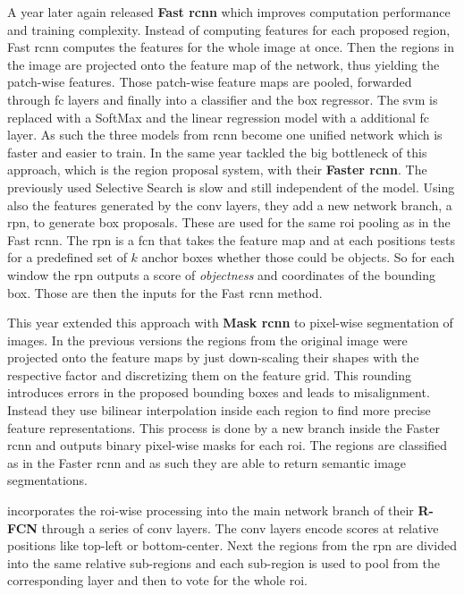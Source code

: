 A year later again \citet{girshick_fast_2015} released \textbf{Fast \gls{rcnn}} which improves computation performance and training complexity. Instead of computing features for each proposed region, Fast \gls{rcnn} computes the features for the whole image at once. Then the regions in the image are projected onto the feature map of the network, thus yielding the patch-wise features. Those patch-wise feature maps are pooled, forwarded through \gls{fc} layers and finally into a classifier and the box regressor. The \gls{svm} is replaced with a SoftMax and the linear regression model with a additional \gls{fc} layer. As such the three models from \gls{rcnn} become one unified network which is faster and easier to train.
\clearpage
In the same year \citet{ren_faster_2015} tackled the big bottleneck of this approach, which is the region proposal system, with their \textbf{Faster \gls{rcnn}}. The previously used Selective Search is slow and still independent of the model. Using also the features generated by the \gls{conv} layers, they add a new network branch, a \gls{rpn}, to generate box proposals. These are used for the same \gls{roi} pooling as in the Fast \gls{rcnn}. The \gls{rpn} is a \gls{fcn} that takes the feature map and at each positions tests for a predefined set of $k$ anchor boxes whether those could be objects. So for each window the \gls{rpn} outputs a score of \textit{objectness} and coordinates of the bounding box. Those are then the inputs for the Fast \gls{rcnn} method.

This year \citet{he_mask_2017} extended this approach with \textbf{Mask \gls{rcnn}} to pixel-wise segmentation of images. In the previous versions the regions from the original image were projected onto the feature maps by just down-scaling their shapes with the respective factor and discretizing them on the feature grid. This rounding introduces errors in the proposed bounding boxes and leads to misalignment. Instead they use bilinear interpolation inside each region to find more precise feature representations. This process is done by a new branch inside the Faster \gls{rcnn} and outputs binary pixel-wise masks for each \gls{roi}. The regions are classified as in the Faster \gls{rcnn} and as such they are able to return semantic image segmentations.

\citet{dai_r-fcn:_2016} incorporates the \gls{roi}-wise processing into the main network branch of their \textbf{R-FCN} through a series of \gls{conv} layers. The \gls{conv} layers encode scores at relative positions like top-left or bottom-center. Next the regions from the \gls{rpn} are divided into the same relative sub-regions and each sub-region is used to pool from the corresponding layer and then to vote for the whole \gls{roi}.

